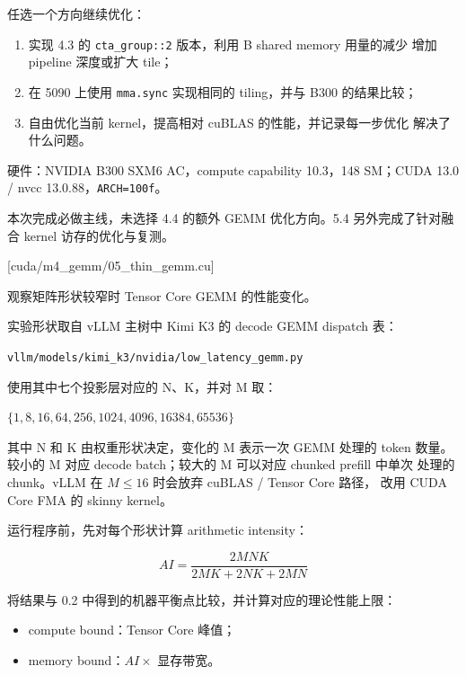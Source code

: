 \documentclass[11pt,a4paper,fontset=fandol]{ctexart}
\providecommand{\tightlist}{\setlength{\itemsep}{0pt}\setlength{\parskip}{0pt}}
\begin{document}

任选一个方向继续优化：

\begin{enumerate}
\def\labelenumi{(\alph{enumi})}
\item
  实现 4.3 的
  \texttt{cta\_\allowbreak{}group:\allowbreak{}:\allowbreak{}2}
  版本，利用 B shared memory 用量的减少 增加 pipeline 深度或扩大 tile；
\item
  在 5090 上使用 \texttt{mma.\allowbreak{}sync} 实现相同的 tiling，并与
  B300 的结果比较；
\item
  自由优化当前 kernel，提高相对 cuBLAS 的性能，并记录每一步优化
  解决了什么问题。
\end{enumerate}

\begin{answer}

硬件：NVIDIA B300 SXM6 AC，compute capability 10.3，148 SM；CUDA 13.0 /
nvcc 13.0.88，\texttt{ARCH=\allowbreak{}100f}。

本次完成必做主线，未选择 4.4 的额外 GEMM 优化方向。5.4
另外完成了针对融合 kernel 访存的优化与复测。

\end{answer}

[cuda/m4\_gemm/05\_thin\_gemm.cu]

观察矩阵形状较窄时 Tensor Core GEMM 的性能变化。

实验形状取自 vLLM 主树中 Kimi K3 的 decode GEMM dispatch 表：

\texttt{vllm/\allowbreak{}models/\allowbreak{}kimi\_\allowbreak{}k3/\allowbreak{}nvidia/\allowbreak{}low\_\allowbreak{}latency\_\allowbreak{}gemm.\allowbreak{}py}

使用其中七个投影层对应的 N、K，并对 M 取：

\(\{1, 8, 16, 64, 256, 1024, 4096, 16384, 65536\}\)

其中 N 和 K 由权重形状决定，变化的 M 表示一次 GEMM 处理的 token 数量。
较小的 M 对应 decode batch；较大的 M 可以对应 chunked prefill 中单次
处理的 chunk。vLLM 在 \(M \le 16\) 时会放弃 cuBLAS / Tensor Core 路径，
改用 CUDA Core FMA 的 skinny kernel。

运行程序前，先对每个形状计算 arithmetic intensity：

\[
AI = \frac{2MNK}{2MK + 2NK + 2MN}
\]

将结果与 0.2 中得到的机器平衡点比较，并计算对应的理论性能上限：

\begin{itemize}
\tightlist
\item
  compute bound：Tensor Core 峰值；
\item
  memory bound：\(AI \times\) 显存带宽。
\end{itemize}
\end{document}
